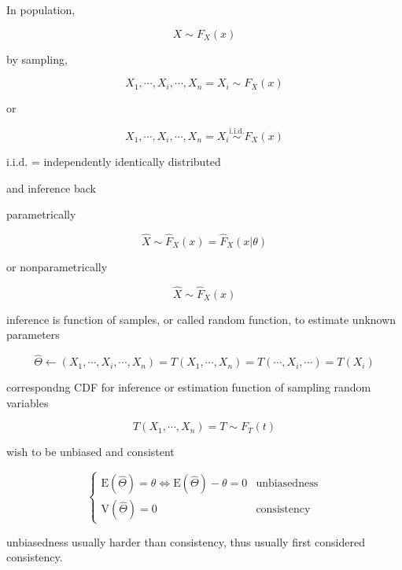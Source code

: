 \documentclass[
]{book}
\theoremstyle{definition}
\theoremstyle{definition}
\theoremstyle{definition}
\theoremstyle{definition}
\theoremstyle{remark}
\begin{document}
In population,

\[
X\sim F_{{\scriptscriptstyle X}}\left(x\right)
\]

by sampling,

\[
X_{{\scriptscriptstyle 1}},\cdots,X_{{\scriptscriptstyle i}},\cdots,X_{{\scriptscriptstyle n}}=X_{{\scriptscriptstyle i}}\sim F_{{\scriptscriptstyle X}}\left(x\right)
\]

or

\[
X_{{\scriptscriptstyle 1}},\cdots,X_{{\scriptscriptstyle i}},\cdots,X_{{\scriptscriptstyle n}}=X_{{\scriptscriptstyle i}}\overset{\text{i.i.d.}}{\sim}F_{{\scriptscriptstyle X}}\left(x\right)
\]

\(\text{i.i.d.}\) = independently identically distributed

and inference back

parametrically

\[
\widehat{X}\sim\widehat{F}_{{\scriptscriptstyle X}}\left(x\right)=\widehat{F}_{{\scriptscriptstyle X}}\left(x|\theta\right)
\]

or nonparametrically

\[
\hat{X}\sim\hat{F}_{{\scriptscriptstyle X}}\left(x\right)
\]

inference is function of samples, or called random function, to estimate unknown parameters

\[
\widehat{\Theta}\leftarrow\left(X_{{\scriptscriptstyle 1}},\cdots,X_{{\scriptscriptstyle i}},\cdots,X_{{\scriptscriptstyle n}}\right)=T\left(X_{{\scriptscriptstyle 1}},\cdots,X_{{\scriptscriptstyle n}}\right)=T\left(\cdots,X_{{\scriptscriptstyle i}},\cdots\right)=T\left(X_{{\scriptscriptstyle i}}\right)
\]

correspondng CDF for inference or estimation function of sampling random variables

\[
T\left(X_{{\scriptscriptstyle 1}},\cdots,X_{{\scriptscriptstyle n}}\right)=T\sim F_{{\scriptscriptstyle T}}\left(t\right)
\]

wish to be unbiased and consistent

\[
\begin{cases}
\mathrm{E}\left(\widehat{\Theta}\right)=\theta\Leftrightarrow\mathrm{E}\left(\widehat{\Theta}\right)-\theta=0 & \text{unbiasedness}\\
\mathrm{V}\left(\widehat{\Theta}\right)=0 & \text{consistency}
\end{cases}
\]

unbiasedness usually harder than consistency, thus usually first considered consistency.
\end{document}
